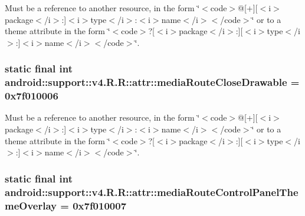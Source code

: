 Must be a reference to another resource, in the form \char`\"{}$<$code$>$@\mbox{[}+\mbox{]}\mbox{[}$<$i$>$package$<$/i$>$:\mbox{]}$<$i$>$type$<$/i$>$:$<$i$>$name$<$/i$>$$<$/code$>$\char`\"{} or to a theme attribute in the form \char`\"{}$<$code$>$?\mbox{[}$<$i$>$package$<$/i$>$:\mbox{]}\mbox{[}$<$i$>$type$<$/i$>$:\mbox{]}$<$i$>$name$<$/i$>$$<$/code$>$\char`\"{}. \hypertarget{classandroid_1_1support_1_1v4_1_1_r_1_1attr_cddcc2f5481df4118d3fd68a13d82bba}{
\subsubsection[{mediaRouteCloseDrawable}]{\setlength{\rightskip}{0pt plus 5cm}static final int android::support::v4.R.R::attr::mediaRouteCloseDrawable = 0x7f010006}}
\label{classandroid_1_1support_1_1v4_1_1_r_1_1attr_cddcc2f5481df4118d3fd68a13d82bba}


Must be a reference to another resource, in the form \char`\"{}$<$code$>$@\mbox{[}+\mbox{]}\mbox{[}$<$i$>$package$<$/i$>$:\mbox{]}$<$i$>$type$<$/i$>$:$<$i$>$name$<$/i$>$$<$/code$>$\char`\"{} or to a theme attribute in the form \char`\"{}$<$code$>$?\mbox{[}$<$i$>$package$<$/i$>$:\mbox{]}\mbox{[}$<$i$>$type$<$/i$>$:\mbox{]}$<$i$>$name$<$/i$>$$<$/code$>$\char`\"{}. \hypertarget{classandroid_1_1support_1_1v4_1_1_r_1_1attr_07bad70a7963149cd297649ee348e1df}{
\subsubsection[{mediaRouteControlPanelThemeOverlay}]{\setlength{\rightskip}{0pt plus 5cm}static final int android::support::v4.R.R::attr::mediaRouteControlPanelThemeOverlay = 0x7f010007}}
\label{classandroid_1_1support_1_1v4_1_1_r_1_1attr_07bad70a7963149cd297649ee348e1df}


